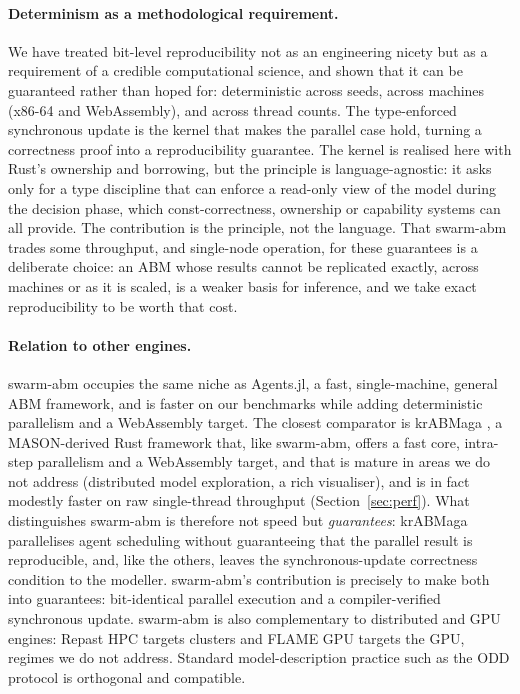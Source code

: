 \documentclass[review]{elsarticle}
\begin{document}
\paragraph{Determinism as a methodological requirement.}
We have treated bit-level reproducibility not as an engineering nicety but as a
requirement of a credible computational science, and shown that it can be
guaranteed rather than hoped for: deterministic across seeds, across machines
(x86-64 and WebAssembly), and across thread counts. The type-enforced
synchronous update is the kernel that makes the parallel case hold, turning a
correctness proof into a reproducibility guarantee. The kernel is realised here
with Rust's ownership and borrowing, but the principle is language-agnostic: it
asks only for a type discipline that can enforce a read-only view of the model
during the decision phase, which const-correctness, ownership or capability
systems can all provide. The contribution is the principle, not the language.
That swarm-abm trades some throughput, and single-node operation, for these
guarantees is a deliberate choice: an ABM whose results cannot be replicated
exactly, across machines or as it is scaled, is a weaker basis for inference, and
we take exact reproducibility to be worth that cost.

\paragraph{Relation to other engines.}
swarm-abm occupies the same niche as Agents.jl, a fast, single-machine,
general ABM framework, and is faster on our benchmarks while adding
deterministic parallelism and a WebAssembly target. The closest comparator is
krABMaga \cite{antelmi2024krabmaga,antelmi2019rust}, a MASON-derived Rust
framework that, like swarm-abm, offers a fast core, intra-step parallelism and a
WebAssembly target, and that is mature in areas we do not address (distributed
model exploration, a rich visualiser), and is in fact modestly faster on raw
single-thread throughput (Section~\ref{sec:perf}). What distinguishes swarm-abm
is therefore not speed but \emph{guarantees}: krABMaga parallelises agent scheduling without
guaranteeing that the parallel result is reproducible, and, like the others,
leaves the synchronous-update correctness condition to the modeller. swarm-abm's
contribution is precisely to make both into guarantees: bit-identical parallel
execution and a compiler-verified synchronous update. swarm-abm is also
complementary to distributed and GPU engines: Repast HPC \cite{collier2013repast}
targets clusters and FLAME GPU \cite{richmond2023flamegpu} targets the GPU,
regimes we do not address. Standard model-description practice such as the ODD
protocol \cite{grimm2006odd} is orthogonal and compatible.
\end{document}
